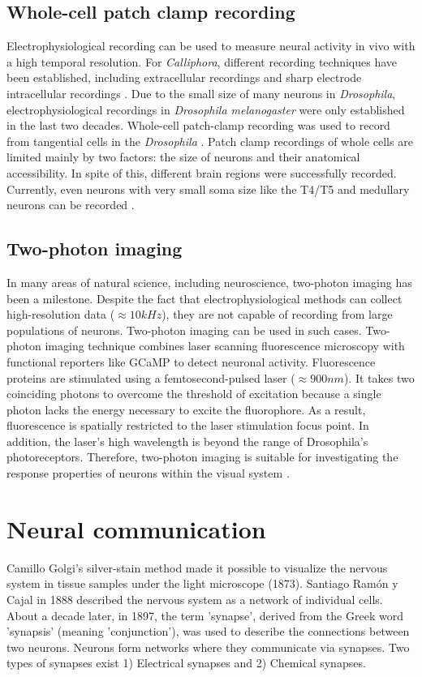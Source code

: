\subsection{Whole-cell patch clamp recording}
Electrophysiological recording can be used to measure neural activity in vivo with a high temporal resolution. For \textit{Calliphora}, different recording techniques have been established, including extracellular recordings and sharp electrode intracellular recordings \parencite{Haag2001}. Due to the small size of many neurons in \textit{Drosophila}, electrophysiological recordings in \textit{Drosophila melanogaster} were only established in the last two decades. Whole-cell patch-clamp recording was used to record from tangential cells in the \textit{Drosophila} \parencite{ Joesch2008}. Patch clamp recordings of whole cells are limited mainly by two factors: the size of neurons and their anatomical accessibility. In spite of this, different brain regions were successfully recorded. Currently, even neurons with very small soma size like the T4/T5 and medullary neurons can be recorded \parencite{Gruntman2018, Groschner2022}.

\subsection{Two-photon imaging}
In many areas of natural science, including neuroscience, two-photon imaging \parencite{Denk1990} has been a milestone. Despite the fact that electrophysiological methods can collect high-resolution data ($\approx 10kHz$), they are not capable of recording from large populations of neurons. Two-photon imaging can be used in such cases. Two-photon imaging technique combines laser scanning fluorescence microscopy with functional reporters like GCaMP to detect neuronal activity. Fluorescence proteins are stimulated using a femtosecond-pulsed laser ($\approx 900nm$). It takes two coinciding photons to overcome the threshold of excitation because a single photon lacks the energy necessary to excite the fluorophore. As a result, fluorescence is spatially restricted to the laser stimulation focus point. In addition, the laser's high wavelength is beyond the range of Drosophila's photoreceptors. Therefore, two-photon imaging is suitable for investigating the response properties of neurons within the visual system \parencite{Maisak2013}.

\section{Neural communication}
Camillo Golgi's silver-stain method made it possible to visualize the nervous system in tissue samples under the light microscope (1873). Santiago Ramón y Cajal in 1888 described the nervous system as a network of individual cells. About a decade later, in 1897, the term 'synapse', derived from the Greek word 'synapsis' (meaning 'conjunction'), was used to describe the connections between two neurons. Neurons form networks where they communicate via synapses. Two types of synapses exist 1) Electrical synapses and 2) Chemical synapses.

